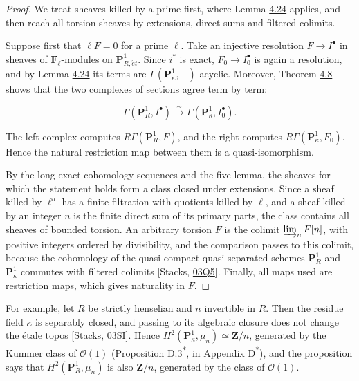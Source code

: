 \documentclass[11pt]{article}
\newcommand{\bpout}[1]{#1\textsuperscript{\hyperlink{bp-outside}{\ensuremath{\ast}}}}
\begin{document}
\begin{proof}[{Proof}]\label{bp72}%
We treat sheaves killed by a prime first, where Lemma \hyperref[bp68]{4.24} applies, and then reach all torsion sheaves by extensions, direct sums and filtered colimits.

Suppose first that \(\ell F=0\) for a prime \(\ell\).  Take an injective resolution \(F\to I^\bullet\) in sheaves of \(\mathbf F_\ell\)-modules on \(\mathbf P^1_{R,\acute{e}t}\). Since \(i^*\) is exact, \(F_0\to I_0^\bullet\) is again a resolution, and by Lemma \hyperref[bp68]{4.24} its terms are \(\Gamma(\mathbf P^1_\kappa,-)\)-acyclic. Moreover, Theorem \hyperref[bp24]{4.8} shows that the two complexes of sections agree term by term:

\[
\Gamma(\mathbf P^1_R,I^\bullet)\xrightarrow{\sim}
\Gamma(\mathbf P^1_\kappa,I_0^\bullet).
\]

The left complex computes \(R\Gamma(\mathbf P^1_R,F)\), and the right computes \(R\Gamma(\mathbf P^1_\kappa,F_0)\). Hence the natural restriction map between them is a quasi-isomorphism.

By the long exact cohomology sequences and the five lemma, the sheaves for which the statement holds form a class closed under extensions. Since a sheaf killed by \(\ell^a\) has a finite filtration with quotients killed by \(\ell\), and a sheaf killed by an integer \(n\) is the finite direct sum of its primary parts, the class contains all sheaves of bounded torsion. An arbitrary torsion \(F\) is the colimit \(\varinjlim_n F[n]\), with positive integers ordered by divisibility, and the comparison passes to this colimit, because the cohomology of the quasi-compact quasi-separated schemes \(\mathbf P^1_R\) and \(\mathbf P^1_\kappa\) commutes with filtered colimits [Stacks, \href{https://stacks.math.columbia.edu/tag/03Q5}{03Q5}]. Finally, all maps used are restriction maps, which gives naturality in \(F\).
\end{proof}

\label{bp73}%
For example, let \(R\) be strictly henselian and \(n\) invertible in \(R\). Then the residue field \(\kappa\) is separably closed, and passing to its algebraic closure does not change the étale topos [Stacks, \href{https://stacks.math.columbia.edu/tag/03SI}{03SI}]. Hence \(H^2(\mathbf P^1_\kappa,\mu_n)\simeq\mathbf Z/n\), generated by the Kummer class of \(\mathcal O(1)\) (Proposition \bpout{D.3}, in Appendix \bpout{D}), and the proposition says that \(H^2(\mathbf P^1_R,\mu_n)\) is also \(\mathbf Z/n\), generated by the class of \(\mathcal O(1)\).
\end{document}
